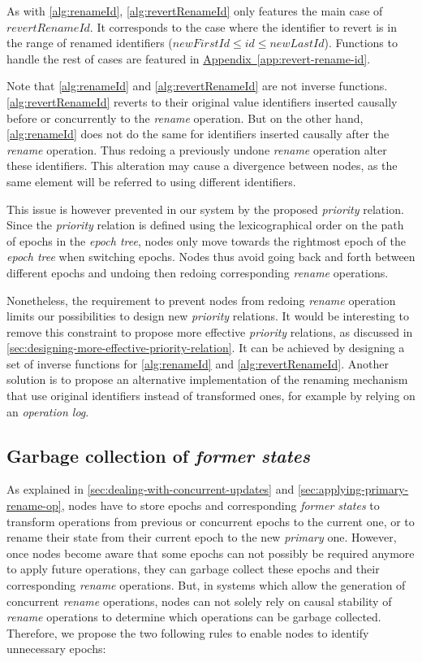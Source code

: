 \documentclass[10pt,journal,compsoc]{IEEEtran}
\newcommand{\refappendix}[1]{\hyperref[#1]{Appendix~\ref*{#1}}} %
\newcommand{\trm}[1]{\mathit{#1}}
\begin{document}
As with \autoref{alg:renameId}, \autoref{alg:revertRenameId} only features the main case of $\trm{revertRenameId}$.
It corresponds to the case where the identifier to revert is in the range of renamed identifiers ($\trm{newFirstId} \leq \trm{id} \leq \trm{newLastId}$).
Functions to handle the rest of cases are featured in \refappendix{app:revert-rename-id}.

Note that \autoref{alg:renameId} and \autoref{alg:revertRenameId} are not inverse functions.
\autoref{alg:revertRenameId} reverts to their original value identifiers inserted causally before or concurrently to the \emph{rename} operation.
But on the other hand, \autoref{alg:renameId} does not do the same for identifiers inserted causally after the \emph{rename} operation.
Thus redoing a previously undone \emph{rename} operation alter these identifiers.
This alteration may cause a divergence between nodes, as the same element will be referred to using different identifiers.

This issue is however prevented in our system by the proposed \emph{priority} relation.
Since the \emph{priority} relation is defined using the lexicographical order on the path of epochs in the \emph{epoch tree}, nodes only move towards the rightmost epoch of the \emph{epoch tree} when switching epochs.
Nodes thus avoid going back and forth between different epochs and undoing then redoing corresponding \emph{rename} operations.

Nonetheless, the requirement to prevent nodes from redoing \emph{rename} operation limits our possibilities to design new \emph{priority} relations.
It would be interesting to remove this constraint to propose more effective \emph{priority} relations, as discussed in \autoref{sec:designing-more-effective-priority-relation}.
It can be achieved by designing a set of inverse functions for \autoref{alg:renameId} and \autoref{alg:revertRenameId}.
Another solution is to propose an alternative implementation of the renaming mechanism that use original identifiers instead of transformed ones, for example by relying on an \emph{operation log}.

\subsection{Garbage collection of \emph{former states}}

As explained in \autoref{sec:dealing-with-concurrent-updates} and \autoref{sec:applying-primary-rename-op}, nodes have to store epochs and corresponding \emph{former states} to transform operations from previous or concurrent epochs to the current one, or to rename their state from their current epoch to the new \emph{primary} one.
However, once nodes become aware that some epochs can not possibly be required anymore to apply future operations, they can garbage collect these epochs and their corresponding \emph{rename} operations.
But, in systems which allow the generation of concurrent \emph{rename} operations, nodes can not solely rely on causal stability of \emph{rename} operations to determine which operations can be garbage collected.
Therefore, we propose the two following rules to enable nodes to identify unnecessary epochs:
\end{document}
